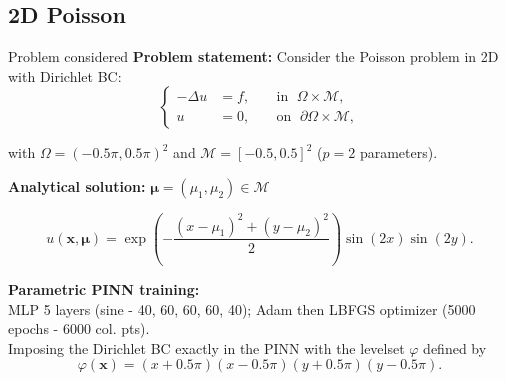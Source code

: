 \subsection{2D Poisson}

\begin{frame}{Problem considered}
	\textbf{Problem statement:} Consider the Poisson problem in 2D with Dirichlet BC:
	\vspace{-5pt}
	\begin{equation*}
		\left\{
		\begin{aligned}
			-\Delta u & = f, \; &  & \text{in } \; \Omega \times \mathcal{M},         \\
			u         & =0, \;  &  & \text{on } \; \partial\Omega \times \mathcal{M},
		\end{aligned}
		\right.
	\end{equation*}

	\vspace{-5pt}
	with $\Omega=(-0.5 \pi, 0.5 \pi)^2$ and $\mathcal{M}=[-0.5,0.5]^2$ ($p=2$ parameters).

	\vspace{8pt}
	\textbf{Analytical solution:} $\bm{\mu}=(\mu_1,\mu_2) \in \mathcal{M}$

	\vspace{-5pt}
	\begin{equation*}
		u(\bm{x},\bm{\mu})=\exp\left(-\frac{(x-\mu_1)^2+(y-\mu_2)^2}{2}\right)\sin(2 x)\sin(2 y).
	\end{equation*}

	\vspace{12pt}
	\textbf{Parametric PINN training:} \\
	MLP 5 layers (sine - 40, 60, 60, 60, 40); Adam then LBFGS optimizer (5000 epochs - 6000 col. pts). \\
	Imposing the Dirichlet BC exactly in the PINN with the levelset $\varphi$ defined by
	$$\varphi(\bm{x})=(x+0.5\pi)(x-0.5\pi)(y+0.5\pi)(y-0.5\pi).$$
\end{frame}

